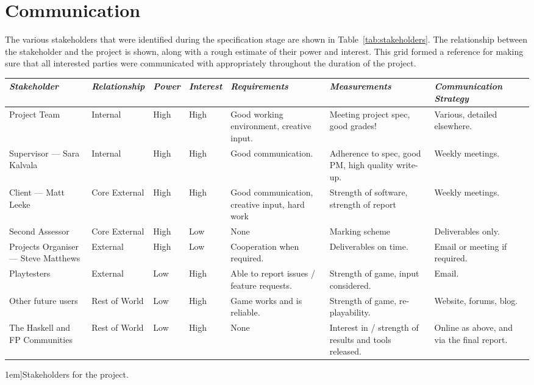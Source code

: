 \section{Communication}

The various stakeholders that were identified during the specification stage are shown in Table~\ref{tab:stakeholders}.
The relationship between the stakeholder and the project is shown, along with a rough
estimate of their power and interest.
This grid formed a reference for making sure that all interested parties were communicated
with appropriately throughout the duration of the project.

\begin{table*}[t]
	\footnotesize
	\renewcommand{\arraystretch}{1.5}
	\begin{tabular}{p{9em} p{5em} p{3em} p{3em} p{9em} p{9em} p{9em}}
		\toprule
		\emph{Stakeholder} & \emph{Relationship} & \emph{Power} & \emph{Interest} & \emph{Requirements} & \emph{Measurements} & \emph{Communication Strategy} \\
		\midrule
		
		Project Team & Internal & High & High & 
		Good working environment, creative input. & 
		Meeting project spec, good grades! & 
		Various, detailed elsewhere. \\
		
		Supervisor --- Sara Kalvala & Internal & High & High & 
		Good communication. & 
		Adherence to spec, good PM, high quality write-up. & 
		Weekly meetings. \\
		
		Client --- Matt Leeke & Core \mbox{External} & High & High & 
		Good communication, creative input, hard work & 
		Strength of software, strength of report & 
		Weekly meetings. \\
		
		Second Assessor & Core \mbox{External} & High & Low & 
		None & 
		Marking scheme & 
		Deliverables only. \\
		
		Projects Organiser --- Steve Matthews & External & High & Low & 
		Cooperation when required. & 
		Deliverables on time. & 
		Email or meeting if required. \\
		
		Playtesters & External & Low & High & 
		Able to report issues / feature requests. & 
		Strength of game, input considered. & 
		Email. \\
		
		Other future users & Rest of World & Low & High & 
		Game works and is reliable. & 
		Strength of game, re-playability. & 
		Website, forums, blog. \\
		
		The Haskell and FP Communities & Rest of World & Low & High & 
		None & 
		Interest in  / strength of results and tools released. & 
		Online as above, and via the final report. \\
		\bottomrule
	\end{tabular}
	\vspace{1.5em}
	\caption[][1em]{Stakeholders for the project.}
	\label{tab:stakeholders}
\end{table*}

